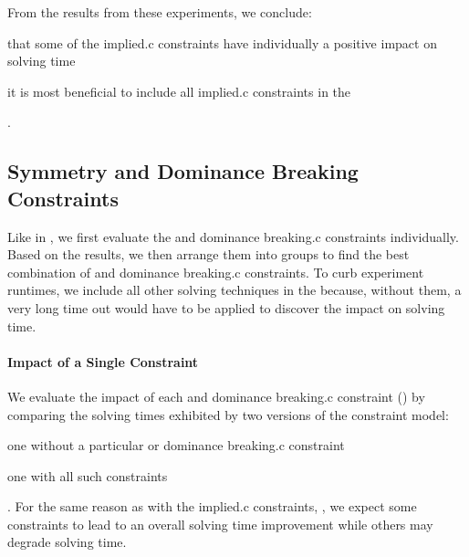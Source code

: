 From the results from these experiments, we conclude:
%
\begin{enumerate*}[label=(\roman*), itemjoin={;\ }, itemjoin*={; but\ }]
  \item that some of the \gls{implied.c} \glspl{constraint} have individually a
    positive impact on solving time
  \item it is most beneficial to include all \gls{implied.c} \glspl{constraint}
    in the 
\end{enumerate*}.


\subsection{Symmetry and Dominance Breaking Constraints}

Like in , we first evaluate
the  and \gls{dominance breaking.c}
\glspl{constraint} individually.
%
Based on the results, we then arrange them into groups to find the best
combination of  and \gls{dominance breaking.c}
\glspl{constraint}.
%
To curb experiment runtimes, we include all other solving techniques in the
 because, without them, a very long time out would
have to be applied to discover the impact on solving time.


\paragraph{Impact of a Single Constraint}

We evaluate the impact of each  and \gls{dominance
  breaking.c} \gls{constraint}
() by
comparing the solving times exhibited by two versions of the \gls{constraint
  model}:
%
\begin{modelList}
  \item {}
    one without a particular  or \gls{dominance
      breaking.c} \gls{constraint}
  \item {}
    one with all such \glspl{constraint}
\end{modelList}.
%
For the same reason as with the \gls{implied.c} \glspl{constraint}, , we expect
some \glspl{constraint} to lead to an overall solving time improvement while
others may degrade solving time.

